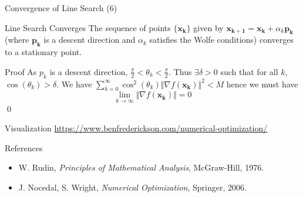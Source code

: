 \documentclass{beamer}
\begin{document}
    \begin{frame}{Convergence of Line Search (6)}
        \begin{block}{Line Search Converges}
            The sequence of points $\{\mathbf{x_k} \}$ given by $\mathbf{x_{k+1}} = \mathbf{x_k} + \alpha_k \mathbf{p_k}$ (where $\mathbf{p_k}$ is a descent direction and $\alpha_k$ satisfies the Wolfe conditions) converges to a \alert{stationary point}.
        \end{block}

        \begin{alertblock}{Proof}
            As $p_k$ is a descent direction, $\frac{\pi}{2} < \theta_k < \frac{\pi}{2}$. Thus $\exists \delta > 0$ such that for all $k$, $\cos(\theta_k) > \delta$.
            We have $\sum_{k=0}^{\infty}\cos^2(\theta_k)\Vert \nabla f(\mathbf{x_k}) \Vert^2 < M$ hence we must have
            $$ \lim_{k \rightarrow \infty} \Vert \nabla f(\mathbf{x_k})\Vert = 0$$ \qed
        \end{alertblock}
    \end{frame}

    \begin{frame}{Visualization}
        \href{https://www.benfrederickson.com/numerical-optimization/}{https://www.benfrederickson.com/numerical-optimization/}
    \end{frame}


    \begin{frame}{References}
        \begin{itemize}
        \item W. Rudin, \textit{Principles of Mathematical Analysis}, McGraw-Hill, 1976.
        
        \item J. Nocedal, S. Wright, \textit{Numerical Optimization}, Springer, 2006.
        \end{itemize}
    \end{frame}
\end{document}
